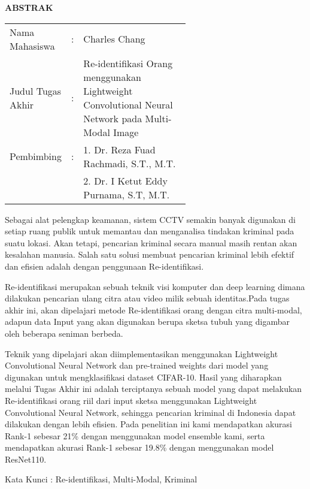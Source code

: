 \begin{center}
	\Large\textbf{ABSTRAK}
\end{center}
\vspace{1ex}

\begin{adjustwidth}{-0.2cm}{}
	\begin{tabular}{lcp{0.6\linewidth}}
		Nama Mahasiswa &:& Charles Chang \\
		Judul Tugas Akhir &:& Re-identifikasi Orang menggunakan
		Lightweight Convolutional Neural Network
		pada Multi-Modal Image\\
		Pembimbing &:& 1. Dr. Reza Fuad Rachmadi, S.T., M.T. \\
		& & 2. Dr. I Ketut Eddy Purnama, S.T, M.T.  \\
	\end{tabular}
\end{adjustwidth}
\vspace{1ex}

\setlength{\parindent}{0cm} Sebagai alat pelengkap keamanan, sistem CCTV semakin banyak digunakan di setiap ruang publik untuk memantau dan menganalisa tindakan kriminal pada suatu lokasi. Akan tetapi, pencarian kriminal secara manual masih rentan akan kesalahan manusia. Salah satu solusi membuat pencarian kriminal lebih efektif dan efisien adalah dengan penggunaan Re-identifikasi.
\par  Re-identifikasi merupakan sebuah teknik visi komputer dan deep learning dimana dilakukan pencarian ulang citra atau video milik sebuah identitas.Pada tugas akhir ini, akan dipelajari metode Re-identifikasi orang dengan citra multi-modal, adapun data Input yang akan digunakan berupa sketsa tubuh yang digambar oleh beberapa seniman berbeda.
\par  Teknik yang dipelajari akan diimplementasikan menggunakan Lightweight Convolutional Neural Network dan pre-trained weights dari model yang digunakan untuk mengklasifikasi dataset CIFAR-10. Hasil yang diharapkan melalui Tugas Akhir ini adalah terciptanya sebuah model yang dapat melakukan Re-identifikasi orang riil dari input sketsa menggunakan Lightweight Convolutional Neural Network, sehingga pencarian kriminal di Indonesia dapat dilakukan dengan lebih efisien. Pada penelitian ini kami mendapatkan akurasi Rank-1 sebesar 21\% dengan menggunakan model ensemble kami, serta mendapatkan akurasi Rank-1 sebesar 19.8\% dengan menggunakan model ResNet110.

\vspace{2ex}

Kata Kunci : Re-identifikasi, Multi-Modal, Kriminal
\newpage